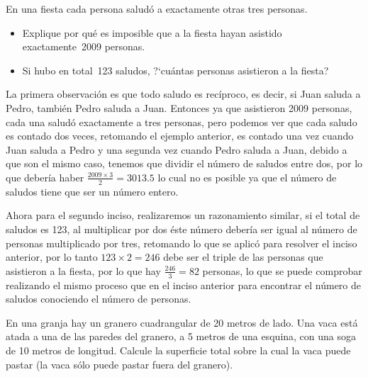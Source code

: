 \begin{Problema}{5}
  En una fiesta cada persona salud\'o a exactamente otras tres personas.
  \begin{itemize}
  \item Explique por qu\'e es imposible que a la fiesta hayan asistido
    exactamente~2009 personas.
  \item Si hubo en total~123 saludos, ?`cu\'antas personas asistieron a
    la fiesta?
  \end{itemize}
\end{Problema}

\begin{Solucion}
  La primera observaci\'on es que todo saludo es rec\'iproco, es
  decir, si Juan saluda a Pedro, tambi\'en Pedro saluda a
  Juan. Entonces ya que asistieron 2009 personas, cada una salud\'o
  exactamente a tres personas, pero podemos ver que cada saludo es
  contado dos veces, retomando el ejemplo anterior, es contado una vez
  cuando Juan saluda a Pedro y una segunda vez cuando Pedro saluda a
  Juan, debido a que son el mismo caso, tenemos que dividir el
  n\'umero de saludos entre dos, por lo que deber\'ia haber
  $\tfrac{2009\times 3}{2}=3013.5$ lo cual no es posible ya que el
  n\'umero de saludos tiene que ser un n\'umero entero.

  Ahora para el segundo inciso, realizaremos un razonamiento similar,
  si el total de saludos es 123, al multiplicar por dos \'este
  n\'umero deber\'ia ser igual al n\'umero de personas multiplicado
  por tres, retomando lo que se aplic\'o para resolver el inciso
  anterior, por lo tanto $123\times 2=246$ debe ser el triple de las
  personas que asistieron a la fiesta, por lo que hay
  $\tfrac{246}{3}=82$ personas, lo que se puede comprobar realizando
  el mismo proceso que en el inciso anterior para encontrar el
  n\'umero de saludos conociendo el n\'umero de personas.
\end{Solucion}

\begin{Problema}{6}
  En una granja hay un granero cuadrangular de 20 metros de lado. Una
  vaca est\'a atada a una de las paredes del granero, a 5 metros de
  una esquina, con una soga de 10 metros de longitud.  Calcule la
  superficie total sobre la cual la vaca puede pastar (la vaca s\'olo
  puede pastar fuera del granero).
\end{Problema}

\begin{Solucion}
  
\end{Solucion}

